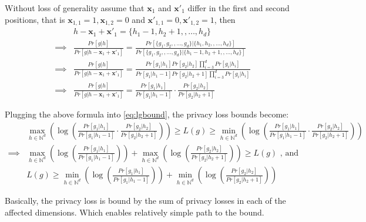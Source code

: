 \documentclass[11pt]{article}
\newcommand{\bbx}{\pmb{x}}
\newcommand{\N}{\mathbb{N}}
\begin{document}
Without loss of generality assume that $\bbx_1$ and $\bbx'_1$ differ in the first and second positions, that is $\bbx_{1,1} = 1, \bbx_{1,2} = 0$ and $\bbx'_{1,1} = 0, \bbx'_{1,2} = 1$, then
\begin{align*}
 & h  - \bbx_1 + \bbx'_1 = \{ {h}_1 - 1, {h}_2 + 1, , \dots, {h}_d\} \\
 \implies &  \frac{  Pr [ g | h ]   } {    Pr [ g | h  - \bbx_1 + \bbx'_1  ]  } = \frac{ Pr [    \{ {g}_1, {g}_2, , \dots, {g}_d\} |  \{ {h}_1, {h}_2, , \dots, {h}_d\} ] } { Pr [    \{ {g}_1, {g}_2, , \dots, {g}_d\} |  \{ {h}_1 - 1, {h}_2 + 1, , \dots, {h}_d\} ]  } \\
  \implies &  \frac{  Pr [ g | h ]   } {    Pr [ g | h  - \bbx_1 + \bbx'_1  ]  } = \frac{  Pr[ g_1 | h_1] Pr[ g_2 | h_2] \prod_{i=3}^d Pr[ g_i | h_i]  } {  Pr[ g_1 | h_1 - 1] Pr[ g_2 | h_2 + 1] \prod_{i=3}^d Pr[ g_i | h_i]  }  \\
   \implies &  \frac{  Pr [ g | h ]   } {    Pr [ g | h  - \bbx_1 + \bbx'_1  ]  } =   \frac{  Pr[ g_1 | h_1]  } {  Pr[ g_1 | h_1 - 1]  } \cdot \frac{  Pr[ g_2 | h_2]  } {  Pr[ g_2 | h_2 + 1]  } 
\end{align*}

Plugging the above formula into \eqref{eq:lgbound}, the privacy loss bounds become:
\begin{align*}
& \max_{h \in \N^d}  \left ( \log \left (   \frac{  Pr[ g_1 | h_1]  } {  Pr[ g_1 | h_1 - 1]  } \cdot \frac{  Pr[ g_2 | h_2]  } {  Pr[ g_2 | h_2 + 1]  }  \right ) \right ) \ge L(g) \ge  \min_{h \in \N^d}  \left ( \log \left (  \frac{  Pr[ g_1 | h_1]  } {  Pr[ g_1 | h_1 - 1]  } \cdot \frac{  Pr[ g_2 | h_2]  } {  Pr[ g_2 | h_2 + 1]  }   \right ) \right ) \\
\implies &  \max_{h \in \N^d}  \left ( \log \left (   \frac{  Pr[ g_1 | h_1]  } {  Pr[ g_1 | h_1 - 1]  } \right ) \right )  + \max_{h \in \N^d}  \left ( \log  \left (\frac{  Pr[ g_2 | h_2]  } {  Pr[ g_2 | h_2 + 1]  }  \right) \right) \ge L(g) \text{ , and } \\
&  L(g) \ge \min_{h \in \N^d}  \left ( \log \left (   \frac{  Pr[ g_1 | h_1]  } {  Pr[ g_1 | h_1 - 1]  } \right ) \right )  + \min_{h \in \N^d}  \left ( \log  \left (\frac{  Pr[ g_2 | h_2]  } {  Pr[ g_2 | h_2 + 1]  }  \right) \right)
\end{align*}

Basically, the privacy loss is bound by the sum of privacy losses in each of the affected dimensions.  Which enables relatively simple path to the bound.   
\end{document}
